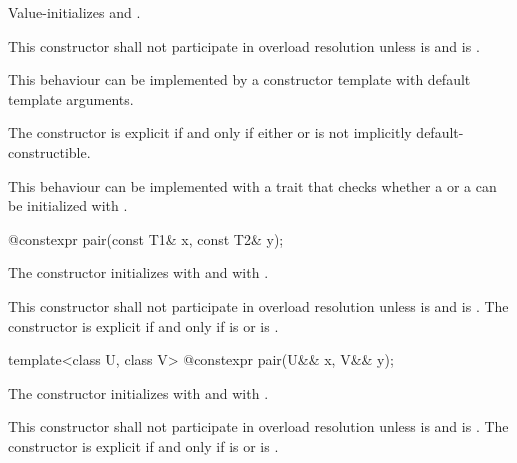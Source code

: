 \begin{itemdescr}
\pnum
\effects
Value-initializes  and .

\pnum
\remarks
This constructor shall not participate in overload resolution unless
 is  and
 is .
\begin{note} This behaviour can be implemented by a constructor template
with default template arguments. \end{note}
The constructor is explicit if and only if either  or
 is not implicitly default-constructible.
\begin{note} This behaviour can be implemented with a trait that checks
whether a  or a 
can be initialized with \tcode{\{\}}. \end{note}
\end{itemdescr}

%
\begin{itemdecl}
@\EXPLICIT@ constexpr pair(const T1& x, const T2& y);
\end{itemdecl}

\begin{itemdescr}
\pnum
\effects
The constructor initializes  with  and 
with .

\pnum
\remarks This constructor shall not participate in overload resolution
unless  is  and
 is .
The constructor is explicit if and only if
 is  or
 is .
\end{itemdescr}

%
\begin{itemdecl}
template<class U, class V> @\EXPLICIT@ constexpr pair(U&& x, V&& y);
\end{itemdecl}

\begin{itemdescr}
\pnum
\effects
The constructor initializes  with
 and 
with .

\pnum
\remarks
This constructor shall not participate in overload resolution unless
 is  and
 is .
The constructor is explicit if and only if
 is  or
 is .
\end{itemdescr}

